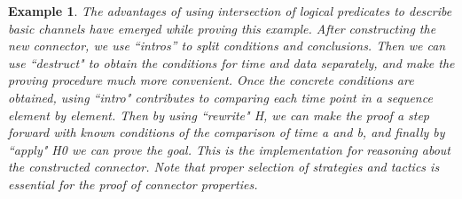 \documentclass[3p,times]{elsarticle}
\newtheorem{example}{Example}[section]
\begin{document}
\begin{example}
The advantages of using intersection of logical predicates to describe basic channels have emerged while proving this example.
After constructing the new connector, we use ``intros'' to split conditions and conclusions. Then we can use ``destruct" to obtain the conditions for time and data separately,
and make the proving procedure much more convenient. Once the concrete conditions are obtained, using ``intro"
contributes to comparing each time point in a sequence element by element. Then by using ``rewrite" \emph{H}, we can make
the proof a step forward with known conditions of the comparison of time \emph{a} and \emph{b}, and finally by
``apply" \emph{H0} we can prove the goal. This is the implementation for reasoning about the constructed connector.
Note that proper selection of strategies and tactics is essential for the proof of connector properties.
\end{example}
\end{document}
